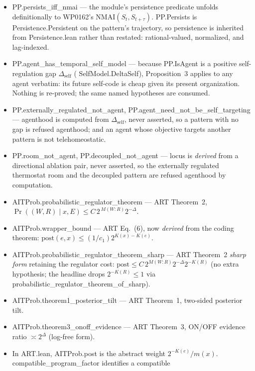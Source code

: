 \documentclass[11pt,a4paper]{article}
\newcommand{\lean}[1]{{\ttfamily\small
  \let\leanunderscore\_\def\_{\leanunderscore\allowbreak}#1}}
\begin{document}
\begin{itemize}[leftmargin=1.4em,itemsep=1pt]
square. This is the snowflake-yeast sign anomaly as a typing fact rather than an exception.
\item \lean{PP.persists\_iff\_nmai} --- the module's persistence predicate unfolds definitionally
to WP0162's $\mathrm{NMAI}(S_t,S_{t+\tau})$. \lean{PP.Persists} is \lean{Persistence.Persistent} on
the pattern's trajectory, so persistence is inherited from \lean{Persistence.lean} rather than
restated: rational-valued, normalized, and lag-indexed.
\item \lean{PP.agent\_has\_temporal\_self\_model} --- because \lean{PP.IsAgent} is a positive
self-regulation gap $\Delta_{\mathrm{self}}$ (\lean{SelfModel.DeltaSelf}), Proposition~3 applies to
any agent verbatim: its future self-code is cheap given its present organization. Nothing is
re-proved; the same named hypotheses are consumed.
\item \lean{PP.externally\_regulated\_not\_agent}, \lean{PP.agent\_need\_not\_be\_self\_targeting}
--- agenthood is computed from $\Delta_{\mathrm{self}}$, never asserted, so a pattern with no gap is
refused agenthood; and an agent whose objective targets another pattern is not telehomeostatic.
\item \lean{PP.room\_not\_agent}, \lean{PP.decoupled\_not\_agent} --- locus is \emph{derived} from a
directional ablation pair, never asserted, so the externally regulated thermostat room and the
decoupled pattern are refused agenthood by computation.
\item \lean{AITProb.probabilistic\_regulator\_theorem} --- ART Theorem~2,
$\Pr((W,R)\mid x,E)\le C\,2^{\,M(W:R)}2^{-\Delta}$.
\item \lean{AITProb.wrapper\_bound} --- ART Eq.~(6), now \emph{derived} from the coding theorem:
$\mathrm{post}(e,x)\le (1/c_1)2^{K(x)-K(e)}$.
\item \lean{AITProb.probabilistic\_regulator\_theorem\_sharp} --- ART Theorem~2 \emph{sharp form}
retaining the regulator cost: $\mathrm{post}\le C\,2^{M(W:R)}2^{-\Delta}2^{-K(R)}$ (no extra
hypothesis; the headline drops $2^{-K(R)}\le 1$ via \lean{probabilistic\_regulator\_theorem\_of\_sharp}).
\item \lean{AITProb.theorem1\_posterior\_tilt} --- ART Theorem~1, two-sided posterior tilt.
\item \lean{AITProb.theorem3\_onoff\_evidence} --- ART Theorem~3, ON/OFF evidence ratio
$\asymp 2^{\Delta}$ (log-free form).
\item In \lean{ART.lean}, \lean{AITProb.post} is the abstract weight
$2^{-K(e)}/m(x)$. \lean{compatible\_program\_factor} identifies a compatible

\end{itemize}
\end{document}
